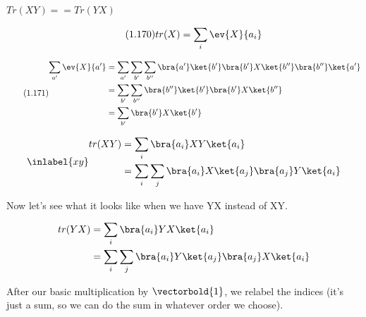 \begin{answer}


\begin{answerpart}{\texorpdfstring{$Tr(XY) == Tr(YX)$}{Tr(XY) == Tr(YX)}}

  \begin{equation}
    \tag{1.170}
    tr(X) = \sum_i \ev{X}{a_i}\\
  \end{equation}

  \begin{equation}
    \tag{1.171}
    \begin{split}
      \sum_{a'}{\ev{X}{a'}}
      &= \sum_{a'}\sum_{b'}\sum_{b''}\bra{a'}\ket{b'}\bra{b'}X\ket{b''}\bra{b''}\ket{a'}\\
      &= \sum_{b'}\sum_{b''}\bra{b''}\ket{b'}\bra{b'}X\ket{b''}\\
      &= \sum_{b'}\bra{b'}X\ket{b'}\\
    \end{split}
  \end{equation}
\end{answerpart}

\begin{equation}
  \inlabel{xy}
  \begin{split}
    tr(XY)
    &= \sum_i\bra{a_i}XY\ket{a_i}\\
    &= \sum_i\sum_j\bra{a_i}X\ket{a_j}\bra{a_j}Y\ket{a_i}\\
  \end{split}
\end{equation}

Now let's see what it looks like when we have YX instead of XY.

\begin{equation}
  \begin{split}
    tr(YX)
    &= \sum_i\bra{a_i}YX\ket{a_i}\\
    &= \sum_i\sum_j\bra{a_i}Y\ket{a_j}\bra{a_j}X\ket{a_i}\\
  \end{split}
\end{equation}

After our basic multiplication by $\vectorbold{1}$, we relabel the
indices (it's just a sum, so we can do the sum in whatever order we
choose).


\end{answer}
